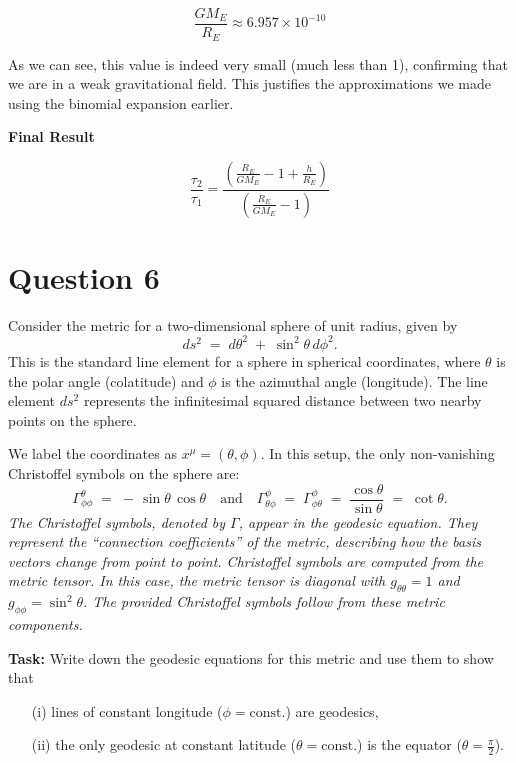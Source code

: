 \documentclass{article}
\begin{document}
\[ \frac{GM_E}{R_E} \approx 6.957 \times 10^{-10} \]

As we can see, this value is indeed very small (much less than 1), confirming that we are in a weak gravitational field. This justifies the approximations we made using the binomial expansion earlier.

\textbf{Final Result}

\[
\frac{\tau_2}{\tau_1}
= \frac
{\left(\frac{R_E}{GM_E} - 1 + \frac{h}{R_E}\right)}
{\left(\frac{R_E}{GM_E} - 1\right)}
\]
\pagebreak



\section*{Question 6}
Consider the metric for a two-dimensional sphere of unit radius, given by
\[
ds^{2} \;=\; d\theta^{2} \;+\; \sin^{2}\theta\,d\phi^{2}.
\]
This is the standard line element for a sphere in spherical coordinates, where \(\theta\) is the polar angle (colatitude) and \(\phi\) is the azimuthal angle (longitude). The line element \(ds^2\) represents the infinitesimal squared distance between two nearby points on the sphere.

We label the coordinates as \(x^{\mu} = (\theta, \phi)\). In this setup, the only non-vanishing Christoffel symbols on the sphere are:
\[
\Gamma_{\phi \phi}^{\theta} 
\;=\; -\,\sin\theta\,\cos\theta
\quad\text{and}\quad
\Gamma_{\theta \phi}^{\phi} 
\;=\; \Gamma_{\phi \theta}^{\phi}
\;=\; \frac{\cos\theta}{\sin\theta}
\;=\; \cot\theta.
\]
\emph{The Christoffel symbols, denoted by \(\Gamma\), appear in the geodesic equation. They represent the ``connection coefficients'' of the metric, describing how the basis vectors change from point to point. Christoffel symbols are computed from the metric tensor. In this case, the metric tensor is diagonal with \(g_{\theta\theta} = 1\) and \(g_{\phi\phi} = \sin^2\theta\). The provided Christoffel symbols follow from these metric components.}

\bigskip

\textbf{Task:} Write down the geodesic equations for this metric and use them to show that
\begin{enumerate}
\item[(i)] lines of constant longitude (\(\phi=\text{const.}\)) are geodesics,
\item[(ii)] the only geodesic at constant latitude (\(\theta = \text{const.}\)) is the equator (\(\theta = \tfrac{\pi}{2}\)).
\end{enumerate}
\end{document}
